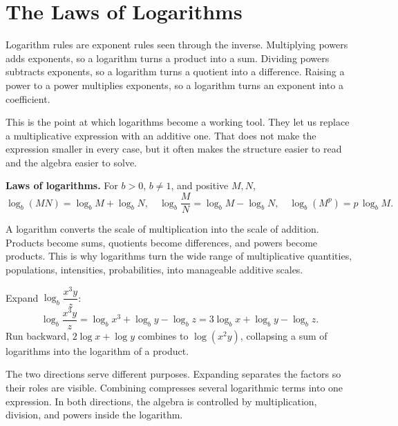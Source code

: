 \documentclass[12pt]{book}
\begin{document}

\section{The Laws of Logarithms}

Logarithm rules are exponent rules seen through the inverse. Multiplying powers adds
exponents, so a logarithm turns a product into a sum. Dividing powers subtracts
exponents, so a logarithm turns a quotient into a difference. Raising a power to a power
multiplies exponents, so a logarithm turns an exponent into a coefficient.

This is the point at which logarithms become a working tool. They let us replace a
multiplicative expression with an additive one. That does not make the expression
smaller in every case, but it often makes the structure easier to read and the algebra
easier to solve.

\begin{keyidea}
\textbf{Laws of logarithms.} For $b>0$, $b\neq1$, and positive $M,N$,
\[
\log_b(MN)=\log_b M+\log_b N,\quad
\log_b\!\frac{M}{N}=\log_b M-\log_b N,\quad
\log_b\!\left(M^{p}\right)=p\,\log_b M.
\]
\end{keyidea}

\begin{visual}
A logarithm converts the scale of multiplication into the scale of addition. Products
become sums, quotients become differences, and powers become products. This is why
logarithms turn the wide range of multiplicative quantities, populations, intensities,
probabilities, into manageable additive scales.
\end{visual}

\begin{example}
Expand $\log_b\dfrac{x^{3}y}{z}$:
\[
\log_b\frac{x^{3}y}{z}=\log_b x^{3}+\log_b y-\log_b z=3\log_b x+\log_b y-\log_b z.
\]
Run backward, $2\log x+\log y$ combines to $\log(x^{2}y)$, collapsing a sum of
logarithms into the logarithm of a product.
\end{example}

The two directions serve different purposes. Expanding separates the factors so their
roles are visible. Combining compresses several logarithmic terms into one expression.
In both directions, the algebra is controlled by multiplication, division, and powers
inside the logarithm.
\end{document}
